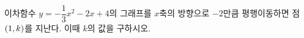 \hspace*{2mm}\begin{minipage}[t]{\dimexpr\linewidth-2mm\relax}\vspace{0pt}
이차함수 $y=-\dfrac{1}{3}x^2-2x+4$의 그래프를 $x$축의 방향으로 $-2$만큼 평행이동하면 점 $(1{,}\mkern3mu k)$를 지난다. 이때 $k$의 값을 구하시오.\end{minipage}
